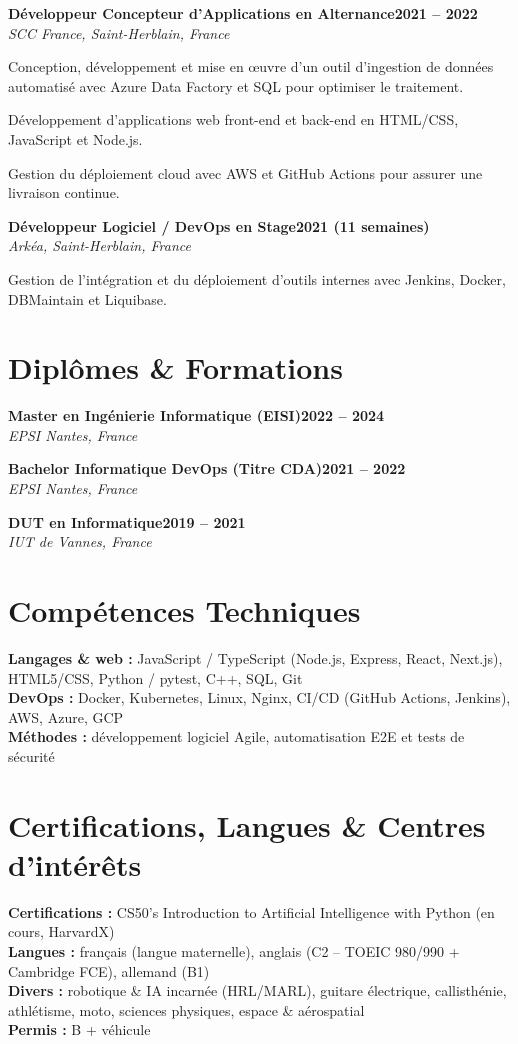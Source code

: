 \documentclass[10pt,a4paper]{article}
\newcommand{\cventry}[3]{%
	\vspace{3pt}%
	\noindent\textbf{#1}\hfill\textbf{#2}\\[1pt]
	\noindent\hspace{1.2em}\textit{#3}\par\vspace{1pt}%
}
\begin{document}
\cventry{Développeur Concepteur d'Applications en Alternance}{2021 -- 2022}{SCC France, Saint-Herblain, France}
\begin{cvlist}
	\item Conception, développement et mise en œuvre d'un outil d'ingestion de données automatisé avec Azure Data Factory et SQL pour optimiser le traitement.
	\item Développement d'applications web front-end et back-end en HTML/CSS, JavaScript et Node.js.
	\item Gestion du déploiement cloud avec AWS et GitHub Actions pour assurer une livraison continue.
\end{cvlist}

\cventry{Développeur Logiciel / DevOps en Stage}{2021 (11 semaines)}{Arkéa, Saint-Herblain, France}
\begin{cvlist}
	\item Gestion de l'intégration et du déploiement d'outils internes avec Jenkins, Docker, DBMaintain et Liquibase.
\end{cvlist}

\section{Diplômes \& Formations}

\cventry{Master en Ingénierie Informatique (EISI)}{2022 -- 2024}{EPSI Nantes, France}
\cventry{Bachelor Informatique DevOps (Titre CDA)}{2021 -- 2022}{EPSI Nantes, France}
\cventry{DUT en Informatique}{2019 -- 2021}{IUT de Vannes, France}

\section{Compétences Techniques}
\textbf{Langages \& web :} JavaScript / TypeScript (Node.js, Express, React, Next.js), HTML5/CSS, Python / pytest, C++, SQL, Git\\[2pt]
\textbf{DevOps :} Docker, Kubernetes, Linux, Nginx, CI/CD (GitHub Actions, Jenkins), AWS, Azure, GCP\\[2pt]
\textbf{Méthodes :} développement logiciel Agile, automatisation E2E et tests de sécurité

\section{Certifications, Langues \& Centres d'intérêts}
\textbf{Certifications :} CS50's Introduction to Artificial Intelligence with Python (en cours, HarvardX)\\[2pt]
\textbf{Langues :} français (langue maternelle), anglais (C2 -- TOEIC 980/990 + Cambridge FCE), allemand (B1)\\[2pt]
\textbf{Divers :} robotique \& IA incarnée (HRL/MARL), guitare électrique, callisthénie, athlétisme, moto, sciences physiques, espace \& aérospatial\\[2pt]
\textbf{Permis :} B + véhicule
\end{document}
